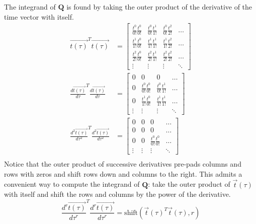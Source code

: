 \documentclass[12pt]{article}
\begin{document}
The integrand of $\mathbf{Q}$ is found by taking the outer product of the
derivative of the time vector with itself.
\begin{align*}
  \vec{t(\tau)}^{T} \vec{t(\tau)} &= 
  \begin{bmatrix}
    \frac{t^{0}}{0!} \frac{t^{0}}{0!} & \frac{t^{0}}{0!} \frac{t^{1}}{1!} &
    \frac{t^{0}}{0!} \frac{t^{2}}{2!}  & \hdots \\[6pt]
    \frac{t^{1}}{1!} \frac{t^{0}}{0!} & \frac{t^{1}}{1!} \frac{t^{1}}{1!} &
    \frac{t^{1}}{1!} \frac{t^{2}}{2!}  & \hdots \\[6pt]
    \frac{t^{2}}{2!} \frac{t^{0}}{0!} & \frac{t^{2}}{2!} \frac{t^{1}}{1!} &
    \frac{t^{2}}{2!} \frac{t^{2}}{2!}  & \hdots \\[6pt]
    \vdots & \vdots & \vdots & \ddots
  \end{bmatrix} \\
  \frac{d\vec{t(\tau)}}{d\tau}^{T} \frac{d\vec{t(\tau)}}{d\tau} &= 
  \begin{bmatrix}
    0 & 0 & 0 & \hdots \\[6pt]
    0 & \frac{t^{0}}{0!} \frac{t^{0}}{0!} & \frac{t^{0}}{0!} \frac{t^{1}}{1!} & \hdots \\[6pt]
    0 & \frac{t^{1}}{1!} \frac{t^{0}}{0!} & \frac{t^{1}}{1!} \frac{t^{1}}{1!} & \hdots \\[6pt]
    \vdots & \vdots & \vdots & \ddots
  \end{bmatrix} \\
  \frac{d^{2}\vec{t(\tau)}}{d\tau^{2}}^{T} \frac{d^{2}\vec{t(\tau)}}{d\tau^{2}} &= 
  \begin{bmatrix}
    0 & 0 & 0 & \hdots \\[6pt]
    0 & 0 & 0 & \hdots \\[6pt]
    0 & 0 & \frac{t^{0}}{0!} \frac{t^{0}}{0!} & \hdots \\[6pt]
    \vdots & \vdots & \vdots & \ddots
  \end{bmatrix} \\
\end{align*}
% 
Notice that the outer product of successive derivatives pre-pads columns and rows
with zeros and shift rows down and columns to the right. This admits a
convenient way to compute the integrand of $\mathbf{Q}$: take the outer product of
$\vec{t}(\tau)$ with itself and shift the rows and columns by the power of the
derivative.
\begin{equation*}
  \frac{d^{r}\vec{t(\tau)}}{d\tau^{r}}^{T} \frac{d^{r}\vec{t(\tau)}}{d\tau^{r}}
  = \text{shift}(\vec{t}(\tau)^{T} \vec{t}(\tau), r) 
\end{equation*}
\end{document}
